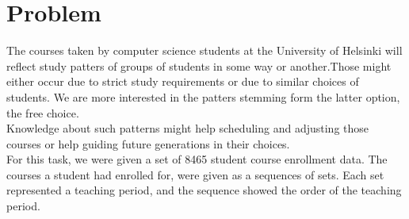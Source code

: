 \section{Problem}

The courses taken by computer science students at the University of Helsinki will reflect study patters of groups of students in some way or another.Those might either occur due to strict study requirements or due to similar choices of students. We are more interested in the patters stemming form the latter option, the free choice.\\

Knowledge about such patterns might help scheduling and adjusting those courses or help guiding future generations in their choices.\\

For this task, we were given a set of 8465 student course enrollment data. The courses a student had enrolled for, were given as a sequences of sets. Each set represented a teaching period, and the sequence showed the order of the teaching period.

